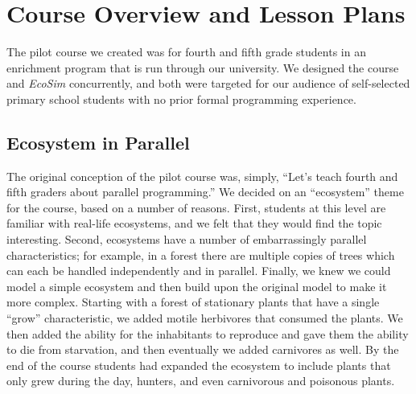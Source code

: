 \documentclass{sig-alternate}
\begin{document}
\section{Course Overview and Lesson Plans}
The pilot course we created was for fourth and fifth grade students in an enrichment program
that is run through our university.  We designed the course and \emph{EcoSim} concurrently,
and both were targeted for our audience of self-selected primary school students with no
prior formal programming experience.

\subsection{Ecosystem in Parallel}
The original conception of the pilot course was, simply, ``Let's teach fourth and fifth graders
about parallel programming.''  We decided on an ``ecosystem'' theme for the course, based on a
number of reasons.  First, students at this level are familiar with real-life ecosystems, and we
felt that they would find the topic interesting.  Second, ecosystems have a number of 
embarrassingly parallel characteristics; for example, in a forest there are multiple copies
of trees which can each be handled independently and in parallel.  
Finally, we knew we could model a simple ecosystem 
and then build upon the original model to make it more complex.  Starting with a forest of
stationary plants that have a single ``grow'' characteristic, we added motile herbivores that
consumed the plants.  We then added the ability for the inhabitants to reproduce and gave them
the ability to die from starvation, and then eventually we added carnivores as well.  
By the end of the course students had expanded the ecosystem to include plants that only
grew during the day, hunters, and even carnivorous and poisonous plants.  
\end{document}
